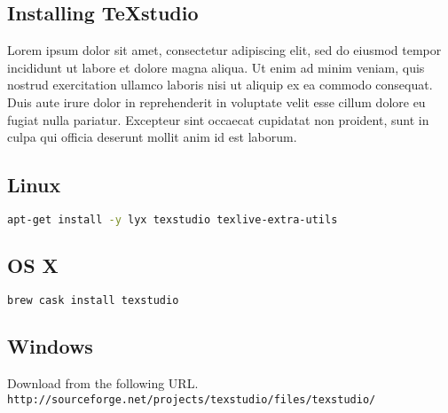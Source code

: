 \documentclass[document.tex]{subfiles}
\begin{document}
\begin{appendices}
        
        \chapter{Installing TeXstudio}
        
        \noindent Lorem ipsum dolor sit amet, consectetur adipiscing elit, sed do eiusmod tempor incididunt ut labore et dolore magna aliqua. Ut enim ad minim veniam, quis nostrud exercitation ullamco laboris nisi ut aliquip ex ea commodo consequat. Duis aute irure dolor in reprehenderit in voluptate velit esse cillum dolore eu fugiat nulla pariatur. Excepteur sint occaecat cupidatat non proident, sunt in culpa qui officia deserunt mollit anim id est laborum.
        
        \section{Linux}
        \begin{lstlisting}[language=bash]
apt-get install -y lyx texstudio texlive-extra-utils
        \end{lstlisting}
        
        \section{OS X}
        \begin{lstlisting}[language=bash]
brew cask install texstudio
        \end{lstlisting}
        
        \section{Windows}
        Download from the following URL.\\
        \texttt{http://sourceforge.net/projects/texstudio/files/texstudio/}
        
\end{appendices}
\end{document}
